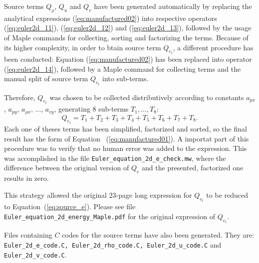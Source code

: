 \documentclass[10pt]{article}
\begin{document}
Source terms $Q_{\rho}$, $Q_u$ and $Q_v$ have been generated automatically by replacing the analytical expressions (\ref{eq:manufactured02}) into  respective operators  (\ref{eq:euler2d_11}), (\ref{eq:euler2d_12}) and (\ref{eq:euler2d_13}), followed by the usage of Maple commands for collecting, sorting and factorizing the terms. Because of its higher complexity, in order to btain source term $Q_{e_t}$, a different procedure has  been conducted: Equation (\ref{eq:manufactured02}) has been replaced into operator (\ref{eq:euler2d_14}), followed by a Maple command for collecting terms and the manual split of source term $Q_{e_t}$ into sub-terms.
 
 Therefore, $Q_{e_t}$ was chosen to be collected distributively according to constants $a_{px}$, $a_{py}$, $a_{\rho x}$,  $\ldots$, $a_{vy}$, generating  8 sub-terms $T_1, \ldots, T_8$:
  $$Q_{e_t}=T_1+T_2+T_3+T_4+T_5+T_6+T_7+T_8.$$
  Each one of theses terms has been simplified, factorized and sorted, so the final result has the form of Equation ~(\ref{eq:manufactured01}). A importat part of this procedure was to  verify that no human error was added to the expression. This was accomplished in the file \texttt{Euler\_equation\_2d\_e\_check.mw}, where the difference between the original version of $Q_e$ and the presented, factorized one results in zero.
  
 This strategy allowed the original  23-page long expression for $Q_{e_t}$ to be reduced to Equation~(\ref{eq:source_e}). Please see file {\tt Euler\_equation\_2d\_energy\_Maple.pdf} for the original expression of $Q_{e_t}$.


Files containing  $C$ codes for the source terms have also been generated. They are: \texttt{Euler\_2d\_e\_code.C, Euler\_2d\_rho\_code.C, Euler\_2d\_u\_code.C} and \texttt{Euler\_2d\_v\_code.C}.
\end{document}
